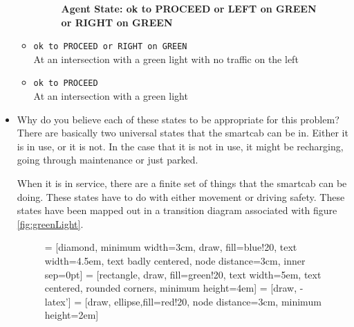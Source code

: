 \documentclass[twoside,openright,titlepage,numbers=noenddot,headinclude,%
               footinclude=true,cleardoublepage=empty,abstractoff,BCOR=5mm,%
               paper=a4,fontsize=11pt,ngerman,american]{scrreprt}
\numberwithin{theorem}{chapter}
\numberwithin{definition}{chapter}
\numberwithin{algorithm}{chapter}
\numberwithin{figure}{chapter}
\numberwithin{table}{chapter}
\numberwithin{equation}{chapter}
\begin{document}
\begin{itemize}
\begin{itemize}
\begin{figure}[!hbtp]
    \caption{\textbf{Agent State: ok to PROCEED or LEFT on GREEN or RIGHT on GREEN}}\label{fig:state2}
    \end{figure}
    
    
    \item \texttt{ok to PROCEED or RIGHT on GREEN} \\At an intersection with a green light with no traffic on the left
    
    \item \texttt{ok to PROCEED} \\ At an intersection with a green light
   
  \end{itemize}



\item Why do you believe each of these states to be appropriate for this problem?\\

There are basically two universal states that the smartcab can be in. Either it is in use, or it is not. In the case that it is not in use, it might be recharging, going through maintenance or just parked.

When it is in service, there are a finite set of things that the smartcab can be doing. These states have to do with either movement or driving safety. These states have been mapped out in a transition diagram associated with figure \ref{fig:greenLight}.



\begin{figure}
\centering
 = [diamond, minimum width=3cm, draw, fill=blue!20, 
    text width=4.5em, text badly centered, node distance=3cm, inner sep=0pt]
 = [rectangle, draw, fill=green!20, 
    text width=5em, text centered, rounded corners, minimum height=4em]
 = [draw, -latex']
 = [draw, ellipse,fill=red!20, node distance=3cm,
    minimum height=2em]
    
\end{figure}
\end{itemize}
\end{document}
